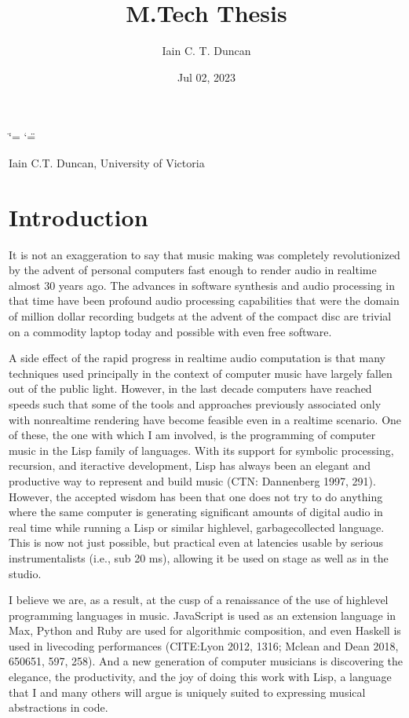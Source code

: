 \documentclass[letterpaper,10pt,english]{sphinxmanual}
\title{M.Tech Thesis}
\date{Jul 02, 2023}
\author{Iain C.\@{} T.\@{} Duncan}
\begin{document}
\ifdefined\shorthandoff
  \ifnum\catcode`\=\string=\active\shorthandoff{=}\fi
  \ifnum\catcode`\"=\active{}\fi
\fi

\pagestyle{empty}
\sphinxmaketitle
\pagestyle{plain}
\sphinxtableofcontents
\pagestyle{normal}
\label{\detokenize{index::doc}}


\sphinxAtStartPar
Iain C.T. Duncan, University of Victoria

\sphinxstepscope


\chapter{Introduction}
\label{\detokenize{introduction:introduction}}\label{\detokenize{introduction::doc}}
\sphinxAtStartPar
It is not an exaggeration to say that music making was
completely revolutionized by the advent of personal computers fast
enough to render audio in realtime almost 30 years ago. The advances
in software synthesis and audio processing in that time have been profound \sphinxhyphen{}
audio processing capabilities that were the domain of million dollar recording budgets
at the advent of the compact disc are trivial on a commodity laptop today and possible
with even free software.

\sphinxAtStartPar
A side effect of the rapid progress in realtime audio computation is that many techniques
used principally in the context of  computer music have largely fallen out of the public light.
However, in the last decade computers have reached speeds such that some of the
tools and approaches previously associated only with non\sphinxhyphen{}realtime rendering have become
feasible even in a realtime scenario.
One of these, the one with which I am involved, is the programming of computer music in the
Lisp family of languages.
With its support for symbolic processing, recursion, and iteractive development,
Lisp has always been an elegant and productive way to represent and build music (CTN: Dannenberg 1997, 291).
However, the accepted wisdom has been that one does not try to do anything
where the same computer is generating significant amounts of digital audio in real time
while running a Lisp or similar high\sphinxhyphen{}level, garbage\sphinxhyphen{}collected language.
This is now not just possible, but practical even at latencies usable by serious instrumentalists
(i.e., sub 20 ms), allowing it be used on stage as well as in the studio.

\sphinxAtStartPar
I believe we are, as a result, at the cusp of a renaissance of the use of high\sphinxhyphen{}level programming languages in music.
JavaScript is used as an extension language in Max,
Python and Ruby are used for algorithmic composition,
and even Haskell is used in live\sphinxhyphen{}coding performances
(CITE:Lyon 2012, 13\sphinxhyphen{}16; Mclean and Dean 2018, 650\sphinxhyphen{}651, 597, 258).
And a new generation of computer
musicians is discovering the elegance, the productivity, and the joy of doing this work
with Lisp, a language that I and many others will argue is uniquely suited to expressing musical
abstractions in code.
\end{document}
